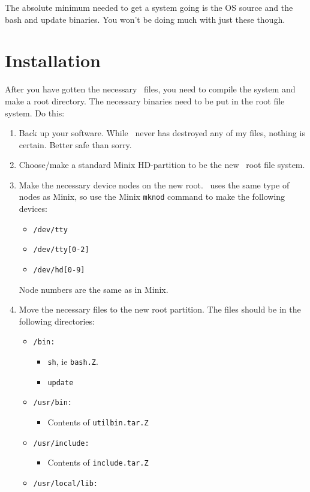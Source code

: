 The absolute minimum needed to get a system going is the OS source and
the bash and update binaries. You won't be doing much with just these
though.

\section{Installation}

After you have gotten the necessary \Linux\ files, you need to compile
the system and make a root directory. The necessary binaries need to be
put in the root file system.
Do this:
\begin{enumerate}
%
\item Back up your software. While \Linux\ never has destroyed any of my
files, nothing is certain. Better safe than sorry.
%
\item Choose/make a standard Minix HD-partition to be the new \Linux\ root
file system.
%
\item Make the necessary device nodes on the new root.  \Linux\ uses the
same type of nodes as Minix, so use the Minix {\tt mknod} command to
make the following devices:
\begin{itemize}
\item{\tt/dev/tty}
\item{\tt/dev/tty[0-2]}
\item{\tt/dev/hd[0-9]}
\end{itemize}
Node numbers are the same as in Minix.
%
\item Move the necessary files to the new root partition. The files
should be in the following directories:
\begin{itemize}
\item{\tt/bin:}
\begin{itemize}
\item{\tt sh}, ie {\tt bash.Z}.
\item{\tt update}
\end{itemize}
\item{\tt/usr/bin:}
\begin{itemize}
\item Contents of {\tt utilbin.tar.Z}
\end{itemize}
\item{\tt/usr/include:}
\begin{itemize}
\item Contents of {\tt include.tar.Z}
\end{itemize}
\item{\tt/usr/local/lib:}
\begin{itemize}

\end{itemize}
\end{itemize}
\end{enumerate}
